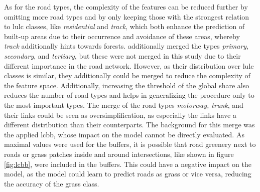 As for the road types, the complexity of the features can be reduced further by omitting more road types and by only keeping those with the strongest relation to \gls{lulc} classes, like \emph{residential} and \emph{track}, which both enhance the prediction of built-up areas due to their occurrence and avoidance of these areas, whereby \emph{track} additionally hints towards forests. \textcite{Atwal.Anderson.ea2022} additionally merged the types \emph{primary}, \emph{secondary}, and \emph{tertiary}, but these were not merged in this study due to their different importance in the road network. However, as their distribution over \gls{lulc} classes is similar, they additionally could be merged to reduce the complexity of the feature space. Additionally, increasing the threshold of the global share also reduces the number of road types and helps in generalizing the procedure only to the most important types. The merge of the road types \emph{motorway, trunk}, and their links could be seen as oversimplification, as especially the links have a different distribution than their counterparts. The background for this merge was the applied \gls{lcbb}, whose impact on the model cannot be directly evaluated. As maximal values were used for the buffers, it is possible that road greenery next to roads or grass patches inside and around intersections, like shown in figure \ref{fig:lcbb}, were included in the buffers. This could have a negative impact on the model, as the model could learn to predict roads as grass or vice versa, reducing the accuracy of the grass class.

